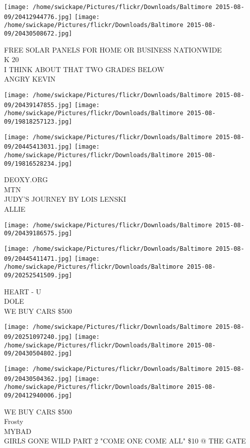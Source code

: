 \documentclass[10pt,letterpaper]{article}
\begin{document}
\texttt{[image: /home/swickape/Pictures/flickr/Downloads/Baltimore 2015-08-09/20412944776.jpg]}
\texttt{[image: /home/swickape/Pictures/flickr/Downloads/Baltimore 2015-08-09/20430508672.jpg]}

FREE SOLAR PANELS FOR HOME OR BUSINESS NATIONWIDE\\
K 20\\
I THINK ABOUT THAT TWO GRADES BELOW\\
ANGRY KEVIN\\
\pagebreak

\texttt{[image: /home/swickape/Pictures/flickr/Downloads/Baltimore 2015-08-09/20439147855.jpg]}
\texttt{[image: /home/swickape/Pictures/flickr/Downloads/Baltimore 2015-08-09/19818257123.jpg]}

\texttt{[image: /home/swickape/Pictures/flickr/Downloads/Baltimore 2015-08-09/20445413031.jpg]}
\texttt{[image: /home/swickape/Pictures/flickr/Downloads/Baltimore 2015-08-09/19816528234.jpg]}

DEOXY.ORG\\
MTN\\
JUDY'S JOURNEY BY LOIS LENSKI\\
ALLIE\\
\pagebreak

\texttt{[image: /home/swickape/Pictures/flickr/Downloads/Baltimore 2015-08-09/20439186575.jpg]}

\vspace{0.25in}
\texttt{[image: /home/swickape/Pictures/flickr/Downloads/Baltimore 2015-08-09/20445411471.jpg]}
\texttt{[image: /home/swickape/Pictures/flickr/Downloads/Baltimore 2015-08-09/20252541509.jpg]}

HEART {-} U\\
DOLE\\
WE BUY CARS \$500\\
\pagebreak

\texttt{[image: /home/swickape/Pictures/flickr/Downloads/Baltimore 2015-08-09/20251097240.jpg]}
\texttt{[image: /home/swickape/Pictures/flickr/Downloads/Baltimore 2015-08-09/20430504802.jpg]}

\texttt{[image: /home/swickape/Pictures/flickr/Downloads/Baltimore 2015-08-09/20430504362.jpg]}
\texttt{[image: /home/swickape/Pictures/flickr/Downloads/Baltimore 2015-08-09/20412940006.jpg]}

WE BUY CARS \$500\\
Frosty\\
MYBAD\\
GIRLS GONE WILD PART 2 "COME ONE COME ALL" \$10 @ THE GATE\\
\pagebreak
\end{document}

